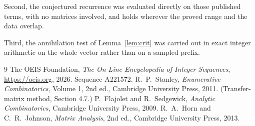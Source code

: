 \documentclass[11pt,a4paper]{article}
\theoremstyle{plain}
\theoremstyle{definition}
\begin{document}
Second, the conjectured recurrence was evaluated directly on those published terms, with no
matrices involved, and holds wherever the proved range and the data overlap.

Third, the annihilation test of Lemma~\ref{lem:crit} was carried out in exact integer
arithmetic on the whole vector rather than on a sampled prefix.

\begin{thebibliography}{9}
 The OEIS Foundation, \emph{The On-Line Encyclopedia of Integer
Sequences}, \url{https://oeis.org}, 2026. Sequence A221572.
 R.~P.~Stanley, \emph{Enumerative Combinatorics}, Volume 1, 2nd ed.,
Cambridge University Press, 2011. (Transfer-matrix method, Section 4.7.)
 P.~Flajolet and R.~Sedgewick, \emph{Analytic Combinatorics}, Cambridge
University Press, 2009.
 R.~A.~Horn and C.~R.~Johnson, \emph{Matrix Analysis}, 2nd ed., Cambridge
University Press, 2013.
\end{thebibliography}
\end{document}
